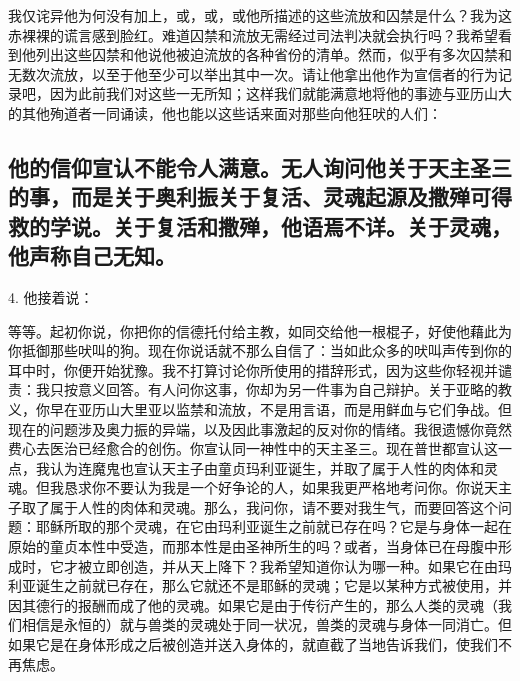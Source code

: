 \par

我仅诧异他为何没有加上，或，或，或他所描述的这些流放和囚禁是什么？我为这赤裸裸的谎言感到脸红。难道囚禁和流放无需经过司法判决就会执行吗？我希望看到他列出这些囚禁和他说他被迫流放的各种省份的清单。然而，似乎有多次囚禁和无数次流放，以至于他至少可以举出其中一次。请让他拿出他作为宣信者的行为记录吧，因为此前我们对这些一无所知；这样我们就能满意地将他的事迹与亚历山大的其他殉道者一同诵读，他也能以这些话来面对那些向他狂吠的人们：\par


\subsection{他的信仰宣认不能令人满意。无人询问他关于天主圣三的事，而是关于奥利振关于复活、灵魂起源及撒殚可得救的学说。关于复活和撒殚，他语焉不详。关于灵魂，他声称自己无知。}

4. 他接着说：\par

\par

等等。起初你说，你把你的信德托付给主教，如同交给他一根棍子，好使他藉此为你抵御那些吠叫的狗。现在你说话就不那么自信了：当如此众多的吠叫声传到你的耳中时，你便开始犹豫。我不打算讨论你所使用的措辞形式，因为这些你轻视并谴责：我只按意义回答。有人问你这事，你却为另一件事为自己辩护。关于亚略的教义，你早在亚历山大里亚以监禁和流放，不是用言语，而是用鲜血与它们争战。但现在的问题涉及奥力振的异端，以及因此事激起的反对你的情绪。我很遗憾你竟然费心去医治已经愈合的创伤。你宣认同一神性中的天主圣三。现在普世都宣认这一点，我认为连魔鬼也宣认天主子由童贞玛利亚诞生，并取了属于人性的肉体和灵魂。但我恳求你不要认为我是一个好争论的人，如果我更严格地考问你。你说天主子取了属于人性的肉体和灵魂。那么，我问你，请不要对我生气，而要回答这个问题：耶稣所取的那个灵魂，在它由玛利亚诞生之前就已存在吗？它是与身体一起在原始的童贞本性中受造，而那本性是由圣神所生的吗？或者，当身体已在母腹中形成时，它才被立即创造，并从天上降下？我希望知道你认为哪一种。如果它在由玛利亚诞生之前就已存在，那么它就还不是耶稣的灵魂；它是以某种方式被使用，并因其德行的报酬而成了他的灵魂。如果它是由于传衍产生的，那么人类的灵魂（我们相信是永恒的）就与兽类的灵魂处于同一状况，兽类的灵魂与身体一同消亡。但如果它是在身体形成之后被创造并送入身体的，就直截了当地告诉我们，使我们不再焦虑。\par

